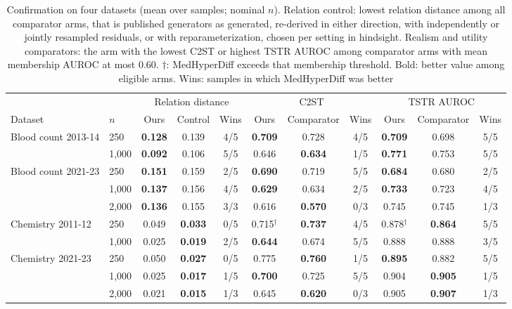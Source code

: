 \documentclass[conference]{IEEEtran}
\begin{document}
\begin{table}[t]
\caption{Confirmation on four datasets (mean over samples; nominal $n$). Relation control: lowest relation distance among all comparator arms, that is published generators as generated, re-derived in either direction, with independently or jointly resampled residuals, or with reparameterization, chosen per setting in hindsight. Realism and utility comparators: the arm with the lowest C2ST or highest TSTR AUROC among comparator arms with mean membership AUROC at most 0.60. $\dagger$: MedHyperDiff exceeds that membership threshold. Bold: better value among eligible arms. Wins: samples in which MedHyperDiff was better}
\label{tab:robust}
\centering
\setlength{\tabcolsep}{4pt}
\begin{tabular}{llccccccccc}
\toprule
& & \multicolumn{3}{c}{Relation distance} & \multicolumn{3}{c}{C2ST} & \multicolumn{3}{c}{TSTR AUROC} \\
Dataset & $n$ & Ours & Control & Wins & Ours & Comparator & Wins & Ours & Comparator & Wins \\
\midrule
Blood count 2013-14 & 250 & \textbf{0.128} & 0.139 & 4/5 & \textbf{0.709} & 0.728 & 4/5 & \textbf{0.709} & 0.698 & 5/5 \\
 & 1,000 & \textbf{0.092} & 0.106 & 5/5 & 0.646 & \textbf{0.634} & 1/5 & \textbf{0.771} & 0.753 & 5/5 \\
Blood count 2021-23 & 250 & \textbf{0.151} & 0.159 & 2/5 & \textbf{0.690} & 0.719 & 5/5 & \textbf{0.684} & 0.680 & 2/5 \\
 & 1,000 & \textbf{0.137} & 0.156 & 4/5 & \textbf{0.629} & 0.634 & 2/5 & \textbf{0.733} & 0.723 & 4/5 \\
 & 2,000 & \textbf{0.136} & 0.155 & 3/3 & 0.616 & \textbf{0.570} & 0/3 & 0.745 & 0.745 & 1/3 \\
Chemistry 2011-12 & 250 & 0.049 & \textbf{0.033} & 0/5 & 0.715$^{\dagger}$ & \textbf{0.737} & 4/5 & 0.878$^{\dagger}$ & \textbf{0.864} & 5/5 \\
 & 1,000 & 0.025 & \textbf{0.019} & 2/5 & \textbf{0.644} & 0.674 & 5/5 & 0.888 & 0.888 & 3/5 \\
Chemistry 2021-23 & 250 & 0.050 & \textbf{0.027} & 0/5 & 0.775 & \textbf{0.760} & 1/5 & \textbf{0.895} & 0.882 & 5/5 \\
 & 1,000 & 0.025 & \textbf{0.017} & 1/5 & \textbf{0.700} & 0.725 & 5/5 & 0.904 & \textbf{0.905} & 1/5 \\
 & 2,000 & 0.021 & \textbf{0.015} & 1/3 & 0.645 & \textbf{0.620} & 0/3 & 0.905 & \textbf{0.907} & 1/3 \\
\bottomrule
\end{tabular}
\end{table}
\end{document}
